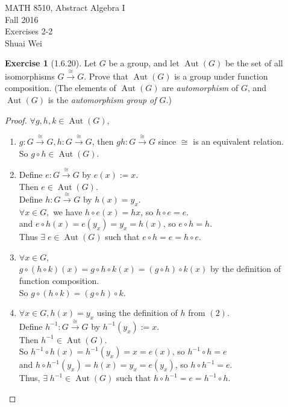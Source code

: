 \documentclass{amsart}
\newcommand{\xra}{\xrightarrow}
\theoremstyle{plain}
\theoremstyle{definition}
\newtheorem{exer}[lem]{Exercise}
\begin{document}
\noindent MATH 8510, Abstract Algebra I \\
Fall 2016\\
Exercises 2-2\\
Shuai Wei
\

%
%

\begin{exer}[1.6.20]
Let $G$ be a group, and let $\operatorname{Aut}(G)$ be the set of all isomorphisms $G\xra\cong G$.
Prove that $\operatorname{Aut}(G)$ is a group under function composition.
(The elements of $\operatorname{Aut}(G)$ are \emph{automorphism} of $G$, and $\operatorname{Aut}(G)$ is 
the \emph{automorphism group of $G$}.)
\begin{proof}
	$\forall g,h,k \in \operatorname{Aut}(G)$,
	\begin{enumerate}
			\item 
				$g: G \xra\cong G, h: G \xra\cong G$, then $gh: G \xra\cong G$ since $\cong$ is an equivalent relation.\\
				So $g\circ h \in \operatorname{Aut}(G)$.
			\item 
				Define $e: G \xra\cong G$ by $e(x) := x$. \\ 
				Then $e \in \operatorname{Aut}(G)$.\\
				Define $h: G \xra\cong G$ by $h(x) = y_x$.\\ 
				$\forall x \in G,$ we have $h\circ e(x) = hx$, so $h\circ e = e$.\\
				and $e\circ h(x) = e(y_x) = y_x = h(x)$, so $e\circ h = h$.\\
				Thus $\exists \; e \in \operatorname{Aut}(G)$ such that $e\circ h = e = h\circ e$.
			\item
				$\forall x \in G$, \\
				$g\circ (h\circ k)(x) = g\circ h\circ k(x) = (g\circ h)\circ k(x)$ by the definition of function composition.\\
				So $g\circ (h\circ k) = (g\circ h)\circ k$.
			\item
				$\forall x \in G, h(x)= y_x$ using the definition of $h$ from $(2)$.\\
				Define $h^{-1}: G \xra\cong G$ by $h^{-1}(y_x) := x$. \\
				Then $h^{-1} \in \operatorname{Aut}(G)$.\\
				So $h^{-1}\circ h(x) = h^{-1}(y_x) = x = e(x)$, so $h^{-1}\circ h = e$\\
				and $h\circ h^{-1}(y_x) = h(x) = y_x = e(y_x)$, so $h\circ h^{-1} = e$.\\
				Thus, $\exists\; h^{-1} \in \operatorname{Aut}(G)$ such that $h\circ h^{-1} = e = h^{-1}\circ h$.

	\end{enumerate}
\end{proof}


\end{exer}
\end{document}
